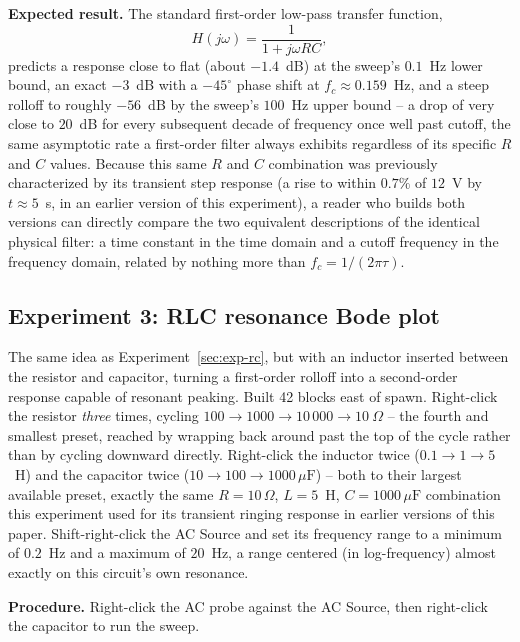 \textbf{Expected result.} The standard first-order low-pass transfer function,
\begin{equation}
H(j\omega) = \frac{1}{1 + j\omega RC},
\end{equation}
predicts a response close to flat (about $-1.4$~dB) at the sweep's $0.1$~Hz lower bound, an
exact $-3$~dB with a $-45^\circ$ phase shift at $f_c \approx 0.159$~Hz, and a steep rolloff to
roughly $-56$~dB by the sweep's $100$~Hz upper bound -- a drop of very close to $20$~dB for
every subsequent decade of frequency once well past cutoff, the same asymptotic rate a
first-order filter always exhibits regardless of its specific $R$ and $C$ values. Because
this same $R$ and $C$ combination was previously characterized by its transient step response
(a rise to within $0.7\%$ of $12$~V by $t \approx 5$~s, in an earlier version of this
experiment), a reader who builds both versions can directly compare the two equivalent
descriptions of the identical physical filter: a time constant in the time domain and a
cutoff frequency in the frequency domain, related by nothing more than
$f_c = 1/(2\pi\tau)$.

\subsection{Experiment 3: RLC resonance Bode plot}
\label{sec:exp-rlc}

The same idea as Experiment~\ref{sec:exp-rc}, but with an inductor inserted between the
resistor and capacitor, turning a first-order rolloff into a second-order response capable of
resonant peaking. Built 42 blocks east of spawn. Right-click the resistor \emph{three} times,
cycling $100 \to 1000 \to 10\,000 \to 10~\Omega$ -- the fourth and smallest preset, reached
by wrapping back around past the top of the cycle rather than by cycling downward directly.
Right-click the inductor twice ($0.1 \to 1 \to 5$~H) and the capacitor twice
($10 \to 100 \to 1000\,\mu\text{F}$) -- both to their largest available preset, exactly the
same $R=10\,\Omega$, $L=5$~H, $C=1000\,\mu\text{F}$ combination this experiment used for its
transient ringing response in earlier versions of this paper. Shift-right-click the AC
Source and set its frequency range to a minimum of $0.2$~Hz and a maximum of $20$~Hz, a range
centered (in log-frequency) almost exactly on this circuit's own resonance.

\textbf{Procedure.} Right-click the AC probe against the AC Source, then right-click the
capacitor to run the sweep.

